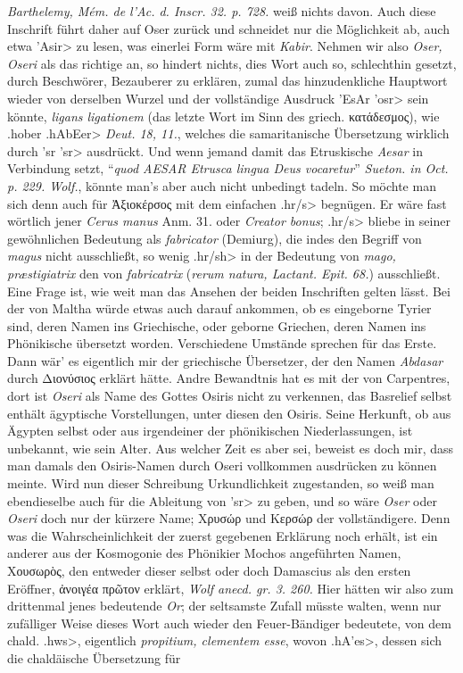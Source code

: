 \documentclass[a4paper, 11pt, oneside]{article}
\begin{document}
\emph{Barthelemy, Mém. de l'Ac. d. Inscr. 32. p. 728.} weiß nichts davon. Auch diese Inschrift führt daher auf Oser zurück und schneidet nur die Möglichkeit ab, auch etwa \foreignlanguage{hebrew}{\<'Asir>} zu lesen, was einerlei Form wäre mit \emph{Kabir}. Nehmen wir also \emph{Oser, Oseri} als das richtige an, so hindert nichts, dies Wort auch so, schlechthin gesetzt, durch Beschwörer, Bezauberer zu erklären, zumal das hinzudenkliche Hauptwort wieder von derselben Wurzel und der vollständige Ausdruck \foreignlanguage{hebrew}{\<'EsAr 'osr>} sein könnte, \emph{ligans ligationem} (das letzte Wort im Sinn des griech. κατάδεσμος), wie \foreignlanguage{hebrew}{\<.hober .hAbEer>} \emph{Deut. 18, 11.}, welches die samaritanische Übersetzung wirklich durch \foreignlanguage{hebrew}{\<'sr 'sr>} ausdrückt. Und wenn jemand damit das Etruskische \emph{Aesar} in Verbindung setzt, "`\emph{quod AESAR Etrusca lingua Deus vocaretur}"' \emph{Sueton. in Oct. p. 229. Wolf.}, könnte man's aber auch nicht unbedingt tadeln. So möchte man sich denn auch für Ἀξιοκέρσος mit dem einfachen \foreignlanguage{hebrew}{\<.hr/s>} begnügen. Er wäre fast wörtlich jener \emph{Cerus manus} Anm. 31. oder \emph{Creator bonus}; \foreignlanguage{hebrew}{\<.hr/s>} bliebe in seiner gewöhnlichen Bedeutung als \emph{fabricator} (Demiurg), die indes den Begriff von \emph{magus} nicht ausschließt, so wenig \foreignlanguage{hebrew}{\<.hr/sh>} in der Bedeutung von \emph{mago, præstigiatrix} den von \emph{fabricatrix} (\emph{rerum natura, Lactant. Epit. 68.}) ausschließt. Eine Frage ist, wie weit man das Ansehen der beiden Inschriften gelten lässt. Bei der von Maltha würde etwas auch darauf ankommen, ob es eingeborne Tyrier sind, deren Namen ins Griechische, oder geborne Griechen, deren Namen ins Phönikische übersetzt worden. Verschiedene Umstände sprechen für das Erste. Dann wär' es eigentlich mir der griechische Übersetzer, der den Namen \emph{Abdasar} durch Διονύσιος erklärt hätte. Andre Bewandtnis hat es mit der von Carpentres, dort ist \emph{Oseri} als Name des Gottes Osiris nicht zu verkennen, das Basrelief selbst enthält ägyptische Vorstellungen, unter diesen den Osiris. Seine Herkunft, ob aus Ägypten selbst oder aus irgendeiner der phönikischen Niederlassungen, ist unbekannt, wie sein Alter. Aus welcher Zeit es aber sei, beweist es doch mir, dass man damals den Osiris-Namen durch Oseri vollkommen ausdrücken zu können meinte. Wird nun dieser Schreibung Urkundlichkeit zugestanden, so weiß man ebendieselbe auch für die Ableitung von \foreignlanguage{hebrew}{\<'sr>} zu geben, und so wäre \emph{Oser} oder \emph{Oseri} doch nur der kürzere Name; Χρυσώρ und Κερσώρ der vollständigere. Denn was die Wahrscheinlichkeit der zuerst gegebenen Erklärung noch erhält, ist ein anderer aus der Kosmogonie des Phönikier Mochos angeführten Namen, Χουσωρὸς, den entweder dieser selbst oder doch Damascius als den ersten Eröffner, ἀνοιγέα πρῶτον erklärt, \emph{Wolf anecd. gr. 3. 260.} Hier hätten wir also zum drittenmal jenes bedeutende \emph{Or}; der seltsamste Zufall müsste walten, wenn nur zufälliger Weise dieses Wort auch wieder den Feuer-Bändiger bedeutete, von dem chald. \foreignlanguage{hebrew}{\<.hws>}, eigentlich \emph{propitium, clementem esse}, wovon \foreignlanguage{hebrew}{\<.hA'es>}, dessen sich die chaldäische Übersetzung für 
\end{document}
